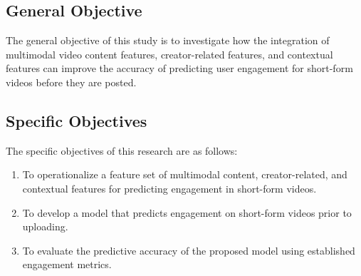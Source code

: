 
\subsection*{General Objective}
The general objective of this study is to investigate how the integration of multimodal video content features, creator-related features, and contextual features can improve the accuracy of predicting user engagement for short-form videos before they are posted.


\subsection*{Specific Objectives}
The specific objectives of this research are as follows:
\begin{enumerate}
    \item To operationalize a feature set of multimodal content, creator-related, and contextual features for predicting engagement in short-form videos.
    \item To develop a model that predicts engagement on short-form videos prior to uploading.
    \item To evaluate the predictive accuracy of the proposed model using established engagement metrics.
\end{enumerate}

